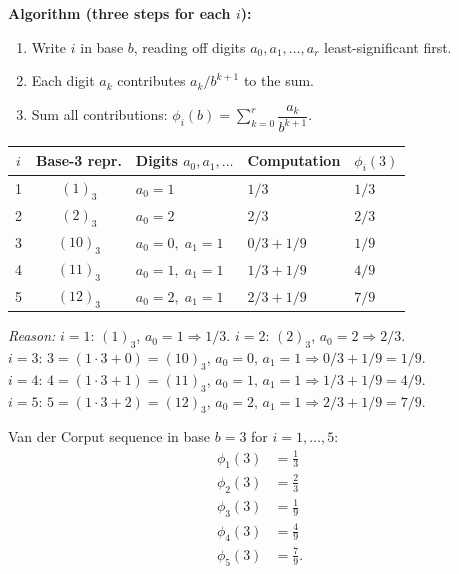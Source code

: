 \documentclass[10pt,a4paper]{article}
\newcommand{\reason}[1]{%
  \begin{mdframed}[backgroundcolor=reasonbg, linewidth=0.4pt,
    innertopmargin=3pt, innerbottommargin=3pt,
    innerleftmargin=6pt, innerrightmargin=6pt]
    \small\textit{Reason:} \small #1
  \end{mdframed}\vspace{2pt}}
\newenvironment{resultbox}{%
  \begin{mdframed}[backgroundcolor=boxbg, linewidth=0.6pt,
    innertopmargin=5pt, innerbottommargin=5pt,
    innerleftmargin=8pt, innerrightmargin=8pt]
}{\end{mdframed}}
\begin{document}
\textbf{Algorithm (three steps for each $i$):}
\begin{enumerate}[noitemsep]
  \item Write $i$ in base $b$, reading off digits $a_0, a_1, \ldots, a_r$ least-significant first.
  \item Each digit $a_k$ contributes $a_k/b^{k+1}$ to the sum.
  \item Sum all contributions: $\phi_i(b) = \displaystyle\sum_{k=0}^{r} \dfrac{a_k}{b^{k+1}}$.
\end{enumerate}

\vspace{4pt}
\begin{center}
\begin{tabular}{cclll}
\toprule
$i$ & Base-3 repr. & Digits $a_0, a_1, \ldots$ & Computation & $\phi_i(3)$ \\
\midrule
1 & $(1)_3$  & $a_0=1$           & $1/3$                 & $1/3$ \\
2 & $(2)_3$  & $a_0=2$           & $2/3$                 & $2/3$ \\
3 & $(10)_3$ & $a_0=0,\;a_1=1$   & $0/3+1/9$             & $1/9$ \\
4 & $(11)_3$ & $a_0=1,\;a_1=1$   & $1/3+1/9$             & $4/9$ \\
5 & $(12)_3$ & $a_0=2,\;a_1=1$   & $2/3+1/9$             & $7/9$ \\
\bottomrule
\end{tabular}
\end{center}

\reason{%
  $i=1$: $(1)_3$, $a_0=1 \Rightarrow 1/3$. \quad
  $i=2$: $(2)_3$, $a_0=2 \Rightarrow 2/3$.\\[2pt]
  $i=3$: $3=(1{\cdot}3+0)=(10)_3$, $a_0=0,\,a_1=1 \Rightarrow 0/3+1/9=1/9$.\\[2pt]
  $i=4$: $4=(1{\cdot}3+1)=(11)_3$, $a_0=1,\,a_1=1 \Rightarrow 1/3+1/9=4/9$.\\[2pt]
  $i=5$: $5=(1{\cdot}3+2)=(12)_3$, $a_0=2,\,a_1=1 \Rightarrow 2/3+1/9=7/9$.}

\begin{resultbox}
Van der Corput sequence in base $b=3$ for $i=1,\ldots,5$:
\begin{align*}
  \phi_1(3) &= \tfrac{1}{3} \\
  \phi_2(3) &= \tfrac{2}{3} \\
  \phi_3(3) &= \tfrac{1}{9} \\
  \phi_4(3) &= \tfrac{4}{9} \\
  \phi_5(3) &= \tfrac{7}{9}.
\end{align*}
\end{resultbox}
\end{document}
